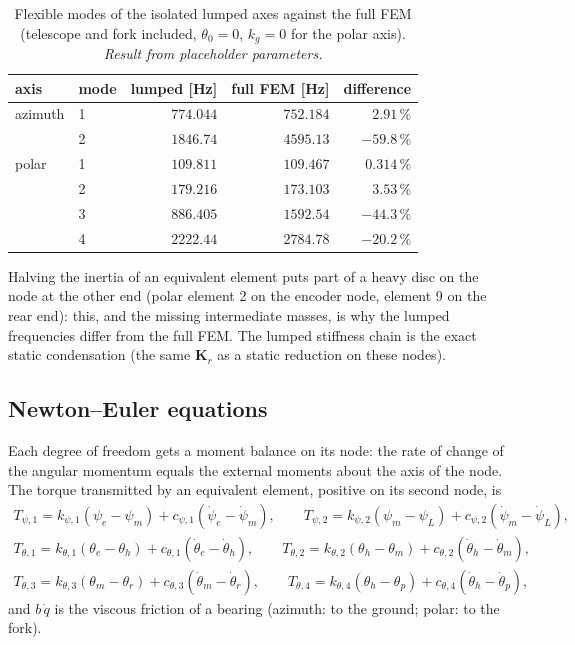 \documentclass[10pt,a4paper]{article}
\numberwithin{equation}{section}
\begin{document}
\begin{table}[H]\centering\small
\caption{Flexible modes of the isolated lumped axes against the full FEM (telescope and fork included, $\theta_0 = 0$, $k_g = 0$ for the polar axis). \emph{Result from placeholder parameters.}}\label{tab:lump_freq}
\begin{tabular}{llrrr}\toprule
axis & mode & lumped [Hz] & full FEM [Hz] & difference \\ \midrule
azimuth & 1 & $774.044$ & $752.184$ & $2.91\,\%$ \\
 & 2 & $1846.74$ & $4595.13$ & $-59.8\,\%$ \\
polar & 1 & $109.811$ & $109.467$ & $0.314\,\%$ \\
 & 2 & $179.216$ & $173.103$ & $3.53\,\%$ \\
 & 3 & $886.405$ & $1592.54$ & $-44.3\,\%$ \\
 & 4 & $2222.44$ & $2784.78$ & $-20.2\,\%$ \\
\bottomrule\end{tabular}\end{table}
Halving the inertia of an equivalent element puts part of a heavy disc on the node at the other end (polar element 2 on the encoder node, element 9 on the rear end): this, and the missing intermediate masses, is why the lumped frequencies differ from the full FEM. The lumped stiffness chain is the exact static condensation (the same $\mathbf K_r$ as a static reduction on these nodes).
\subsection{Newton--Euler equations}\label{subsec:lump_ne}
Each degree of freedom gets a moment balance on its node: the rate of change of the angular momentum equals the external moments about the axis of the node. The torque transmitted by an equivalent element, positive on its second node, is
\begin{gather}
T_{\psi,1} = k_{\psi,1}(\psi_e - \psi_m) + c_{\psi,1}(\dot\psi_e - \dot\psi_m),\qquad T_{\psi,2} = k_{\psi,2}(\psi_m - \psi_L) + c_{\psi,2}(\dot\psi_m - \dot\psi_L),\\
T_{\theta,1} = k_{\theta,1}(\theta_e - \theta_h) + c_{\theta,1}(\dot\theta_e - \dot\theta_h),\qquad T_{\theta,2} = k_{\theta,2}(\theta_h - \theta_m) + c_{\theta,2}(\dot\theta_h - \dot\theta_m),\\ T_{\theta,3} = k_{\theta,3}(\theta_m - \theta_r) + c_{\theta,3}(\dot\theta_m - \dot\theta_r),\qquad T_{\theta,4} = k_{\theta,4}(\theta_h - \theta_p) + c_{\theta,4}(\dot\theta_h - \dot\theta_p),
\end{gather}
and $b\,\dot q$ is the viscous friction of a bearing (azimuth: to the ground; polar: to the fork).
\end{document}

